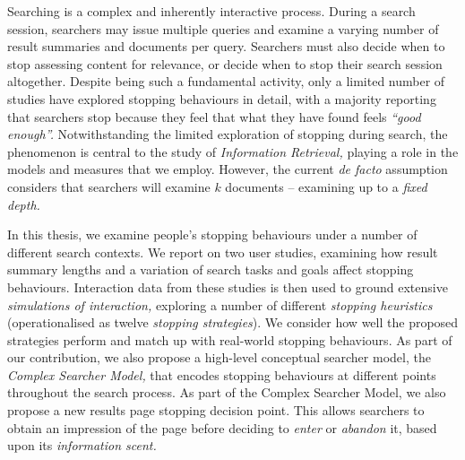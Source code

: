 
\begin{preamble}
{}

Searching is a complex and inherently interactive process. During a search session, searchers may issue multiple queries and examine a varying number of result summaries and documents per query. Searchers must also decide when to stop assessing content for relevance, or decide when to stop their search session altogether. Despite being such a fundamental activity, only a limited number of studies have explored stopping behaviours in detail, with a majority reporting that searchers stop because they feel that what they have found feels \emph{``good enough''.} Notwithstanding the limited exploration of stopping during search, the phenomenon is central to the study of \emph{Information Retrieval,} playing a role in the models and measures that we employ. However, the current \emph{de facto} assumption considers that searchers will examine $k$ documents -- examining up to a \emph{fixed depth.}

In this thesis, we examine people's stopping behaviours under a number of different search contexts. We report on two user studies, examining how result summary lengths and a variation of search tasks and goals affect stopping behaviours. Interaction data from these studies is then used to ground extensive \emph{simulations of interaction,}  exploring a number of different \emph{stopping heuristics} (operationalised as twelve \emph{stopping strategies}). We consider how well the proposed strategies perform and match up with real-world stopping behaviours. As part of our contribution, we also propose a high-level conceptual searcher model, the \emph{Complex Searcher Model,} that encodes stopping behaviours at different points throughout the search process. As part of the Complex Searcher Model, we also propose a new results page stopping decision point. This allows searchers to obtain an impression of the page before deciding to \emph{enter} or \emph{abandon} it, based upon its \emph{information scent.}


\end{preamble}
